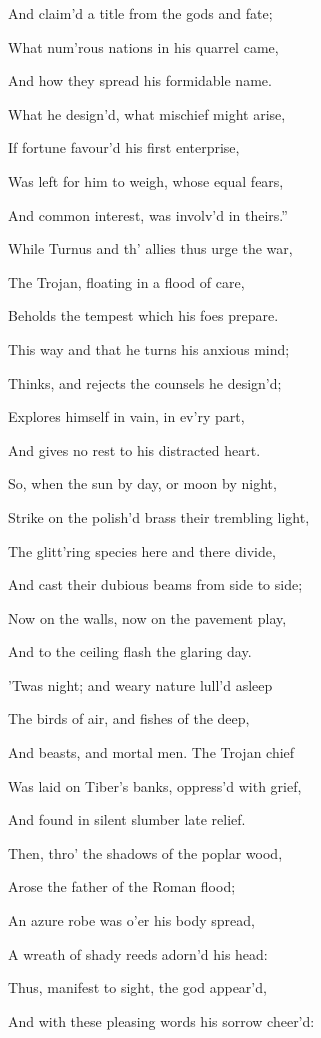 And claim’d a title from the gods and fate;

What num’rous nations in his quarrel came,

And how they spread his formidable name.

What he design’d, what mischief might arise,

If fortune favour’d his first enterprise,

Was left for him to weigh, whose equal fears,

And common interest, was involv’d in theirs.”

While Turnus and th’ allies thus urge the war,

The Trojan, floating in a flood of care,

Beholds the tempest which his foes prepare.

This way and that he turns his anxious mind;

Thinks, and rejects the counsels he design’d;

Explores himself in vain, in ev’ry part,

And gives no rest to his distracted heart.

So, when the sun by day, or moon by night,

Strike on the polish’d brass their trembling light,

The glitt’ring species here and there divide,

And cast their dubious beams from side to side;

Now on the walls, now on the pavement play,

And to the ceiling flash the glaring day.

’Twas night; and weary nature lull’d asleep

The birds of air, and fishes of the deep,

And beasts, and mortal men. The Trojan chief

Was laid on Tiber’s banks, oppress’d with grief,

And found in silent slumber late relief.

Then, thro’ the shadows of the poplar wood,

Arose the father of the Roman flood;

An azure robe was o’er his body spread,

A wreath of shady reeds adorn’d his head:

Thus, manifest to sight, the god appear’d,

And with these pleasing words his sorrow cheer’d:

